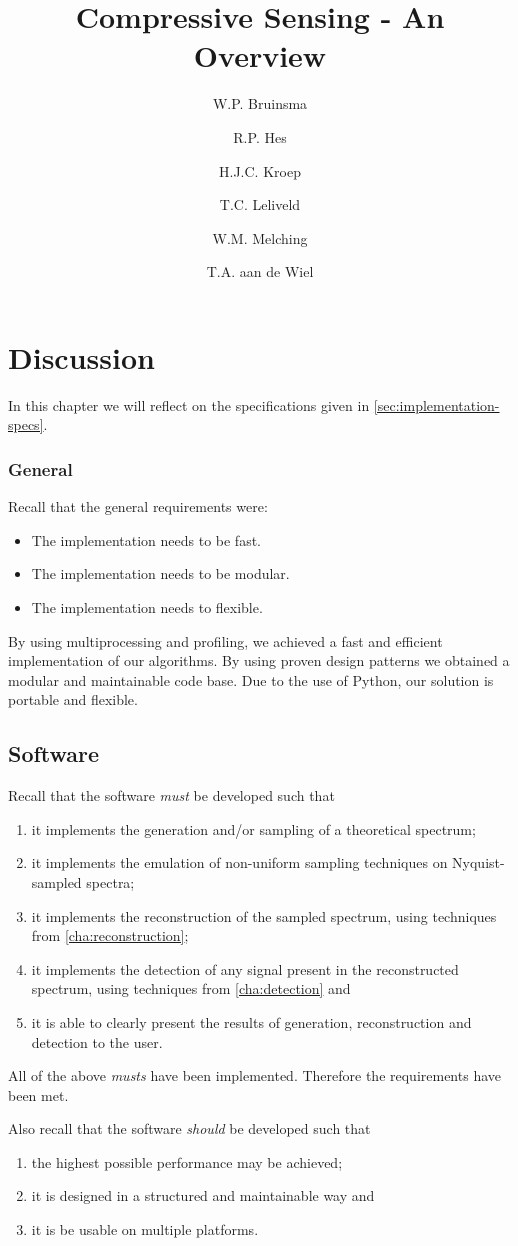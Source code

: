 \documentclass[a4paper, openany, oneside]{memoir}
\title{Compressive Sensing - An Overview}
\author{W.P. Bruinsma \and R.P. Hes \and H.J.C. Kroep \and T.C. Leliveld \and W.M. Melching \and T.A. aan de Wiel}
\begin{document}
\chapter{Discussion}
In this chapter we will reflect on the specifications given in \cref{sec:implementation-specs}.

\subsection{General}
Recall that the general requirements were:
\begin{itemize}
    \item The implementation needs to be fast.
    \item The implementation needs to be modular.
    \item The implementation needs to flexible.
\end{itemize}

By using multiprocessing and profiling, we achieved a fast and efficient implementation of our algorithms. By using proven design patterns we obtained a modular and maintainable code base. Due to the use of Python, our solution is portable and flexible.

\section{Software}
Recall that the software \emph{must} be developed such that
\begin{enumerate}
    \item it implements the generation and/or sampling of a theoretical spectrum;
    \item it implements the emulation of non-uniform sampling techniques on Nyquist-sampled spectra;
    \item it implements the reconstruction of the sampled spectrum, using techniques from \cref{cha:reconstruction};
    \item it implements the detection of any signal present in the reconstructed spectrum, using techniques from \cref{cha:detection} and
    \item it is able to clearly present the results of generation, reconstruction and detection to the user.
\end{enumerate}

All of the above \textit{musts} have been implemented. Therefore the requirements have been met.

Also recall that the software \emph{should} be developed such that
\begin{enumerate}
    \item the highest possible performance may be achieved;
    \item it is designed in a structured and maintainable way and
    \item it is be usable on multiple platforms.
\end{enumerate}
\end{document}

